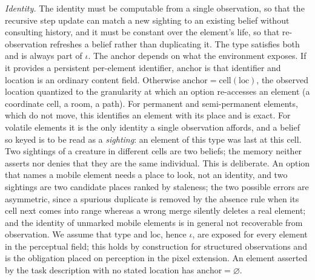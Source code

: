 \documentclass[11pt]{article}
\newcommand{\loc}{\mathrm{loc}}
\newcommand{\anchor}{\mathrm{anchor}}
\newcommand{\cell}{\mathrm{cell}}
\newcommand{\type}{\mathrm{type}}
\begin{document}
\emph{Identity.} The identity must be computable from a single observation, so that the recursive step update can match a new sighting to an existing belief without consulting history, and it must be constant over the element's life, so that re-observation refreshes a belief rather than duplicating it. The type satisfies both and is always part of $\iota$. The anchor depends on what the environment exposes. If it provides a persistent per-element identifier, $\anchor$ is that identifier and location is an ordinary content field. Otherwise $\anchor=\cell(\loc)$, the observed location quantized to the granularity at which an option re-accesses an element (a coordinate cell, a room, a path). For permanent and semi-permanent elements, which do not move, this identifies an element with its place and is exact. For volatile elements it is the only identity a single observation affords, and a belief so keyed is to be read as a \emph{sighting}: an element of this type was last at this cell. Two sightings of a creature in different cells are two beliefs; the memory neither asserts nor denies that they are the same individual. This is deliberate. An option that names a mobile element needs a place to look, not an identity, and two sightings are two candidate places ranked by staleness; the two possible errors are asymmetric, since a spurious duplicate is removed by the absence rule when its cell next comes into range whereas a wrong merge silently deletes a real element; and the identity of unmarked mobile elements is in general not recoverable from observation. We assume that $\type$ and $\loc$, hence $\iota$, are exposed for every element in the perceptual field; this holds by construction for structured observations and is the obligation placed on perception in the pixel extension. An element asserted by the task description with no stated location has $\anchor=\varnothing$.
\end{document}
